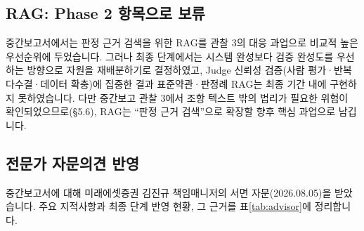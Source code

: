 \documentclass[10pt,a4paper]{article}
\begin{document}
\subsection{RAG: Phase 2 항목으로 보류}
중간보고서에서는 판정 근거 검색을 위한 RAG를 관찰 3의 대응 과업으로 비교적 높은 우선순위에 두었습니다. 그러나 최종 단계에서는 시스템 완성보다 검증 완성도를 우선하는 방향으로 자원을 재배분하기로 결정하였고, Judge 신뢰성 검증(사람 평가·반복 다수결·데이터 확충)에 집중한 결과 표준약관·판정례 RAG는 최종 기간 내에 구현하지 못하였습니다. 다만 중간보고 관찰 3에서 조항 텍스트 밖의 법리가 필요한 위험이 확인되었으므로(\S5.6), RAG는 ``판정 근거 검색''으로 확장할 향후 핵심 과업으로 남깁니다.

\subsection{전문가 자문의견 반영}
중간보고서에 대해 미래에셋증권 김진규 책임매니저의 서면 자문(2026.08.05)을 받았습니다. 주요 지적사항과 최종 단계 반영 현황, 그 근거를 표\ref{tab:advisor}에 정리합니다.
\end{document}
